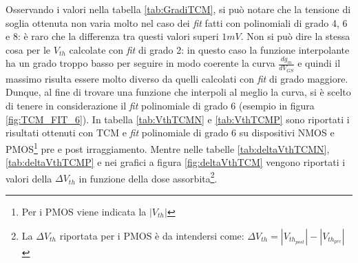 Osservando i valori nella tabella \ref{tab:GradiTCM}, si può notare che la tensione di soglia ottenuta non varia molto nel caso dei \emph{fit} fatti con polinomiali di grado 4, 6 e 8: è raro che la differenza tra questi valori superi $1 mV$. Non si può dire la stessa cosa per le $V_{th}$ calcolate con \emph{fit} di grado 2: in questo caso la funzione interpolante ha un grado troppo basso per seguire in modo coerente la curva $\frac{dg_m}{dV_{GS}}$ e quindi il massimo risulta essere molto diverso da quelli calcolati con \emph{fit} di grado maggiore. Dunque, al fine di trovare una funzione che interpoli al meglio la curva, si è scelto di tenere in considerazione il \emph{fit} polinomiale di grado 6 (esempio in figura \ref{fig:TCM_FIT_6}). In tabella \ref{tab:VthTCMN} e \ref{tab:VthTCMP} sono riportati i risultati ottenuti con TCM e \emph{fit} polinomiale di grado 6 su dispositivi NMOS e PMOS\footnote{Per i PMOS viene indicata la $|V_{th}|$ } pre e post irraggiamento.
Mentre nelle tabelle \ref{tab:deltaVthTCMN}, \ref{tab:deltaVthTCMP} e nei grafici a figura \ref{fig:deltaVthTCM} vengono riportati i valori della $\Delta V_{th}$ in funzione della dose assorbita\footnote{La $\Delta V_{th} $ riportata per i PMOS è da intendersi come: $\Delta V_{th} = |V_{th_{post}}| - |V_{th_{pre}}|$}.

\clearpage


